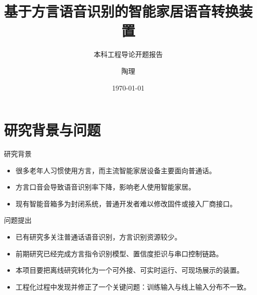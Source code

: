 \documentclass[10pt]{beamer}
\title{基于方言语音识别的智能家居语音转换装置}
\subtitle{本科工程导论开题报告}
\author{陶理}
\date{\today}
\begin{document}
\maketitle
\begin{frame}
    \centering
    \tableofcontents
\end{frame}

\section{研究背景与问题}
\begin{frame}{研究背景}
    \begin{itemize}
        \item 很多老年人习惯使用方言，而主流智能家居设备主要面向普通话。
        \item 方言口音会导致语音识别率下降，影响老人使用智能家居。
        \item 现有智能音箱多为封闭系统，普通开发者难以修改固件或接入厂商接口。
    \end{itemize}
\end{frame}
\begin{frame}{问题提出}
    \begin{itemize}
        \item 已有研究多关注普通话语音识别，方言识别资源较少。
        \item 前期研究已经完成方言指令识别模型、置信度拒识与串口控制链路。
        \item 本项目要把离线研究转化为一个可外接、可实时运行、可现场展示的装置。
        \item 工程化过程中发现并修正了一个关键问题：训练输入与线上输入分布不一致。
    \end{itemize}
\end{frame}
\end{document}
